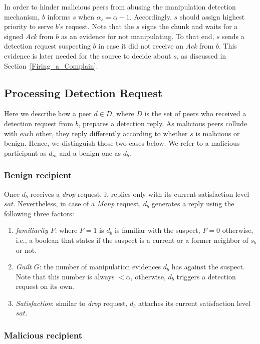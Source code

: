 In order to hinder malicious peers from abusing the manipulation detection mechanism, $b$ informs $s$ when $\alpha_s = \alpha -1$.
Accordingly, $s$ should assign highest priority to serve $b$'s request. Note that the $s$ signs the chunk and waits for a signed \textit{Ack} from $b$ as an evidence for not manipulating.
To that end, $s$ sends a detection request suspecting $b$ in case it did not receive an \textit{Ack} from $b$.
This evidence is later needed for the source to decide about $s$, as discussed in Section~\ref{Firing_a_Complain}.

\subsection{Processing Detection Request}
Here we describe how a peer $d \in D$, where $D$ is the set of peers who received a detection request from $b$, prepares a detection reply.
As malicious peers collude with each other, they reply differently according to whether $s$ is malicious or benign.
Hence, we distinguish those two cases below. We refer to a malicious participant as $d_m$ and a benign one as $d_b$.

\subsubsection*{Benign recipient}
Once $d_b$ receives a \textit{drop} request, it replies only with its current satisfaction level $sat$.
Nevertheless, in case of a \textit{Manp} request, $d_b$ generates a reply using the following three factors:
\begin{enumerate}
 \item \textit{familiarity $F$}: where $F=1$ is $d_b$ is familiar with the suspect, $F=0$ otherwise, i.e., a boolean that states if the suspect is a current or a former neighbor of $s_b$ or not.
 \item \textit{Guilt $G$}: the number of manipulation evidences $d_b$ has against the suspect.
 Note that this number is always $<\alpha$, otherwise, $d_b$ triggers a detection request on its own.
 \item \textit{Satisfaction}: similar to \textit{drop} request, $d_b$ attaches its current satisfaction level $sat$.
\end{enumerate}


\subsubsection*{Malicious recipient}

